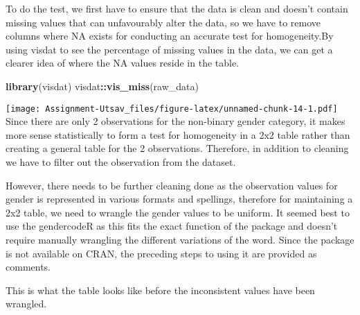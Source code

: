 \documentclass[
]{article}
\newenvironment{Shaded}{\begin{snugshade}}{\end{snugshade}}
\newcommand{\DecValTok}[1]{\textcolor[rgb]{0.00,0.00,0.81}{#1}}
\newcommand{\KeywordTok}[1]{\textcolor[rgb]{0.13,0.29,0.53}{\textbf{#1}}}
\newcommand{\NormalTok}[1]{#1}
\newcommand{\OperatorTok}[1]{\textcolor[rgb]{0.81,0.36,0.00}{\textbf{#1}}}
\newcommand{\StringTok}[1]{\textcolor[rgb]{0.31,0.60,0.02}{#1}}
\begin{document}
To do the test, we first have to ensure that the data is clean and
doesn't contain missing values that can unfavourably alter the data, so
we have to remove columns where NA exists for conducting an accurate
test for homogeneity.By using visdat to see the percentage of missing
values in the data, we can get a clearer idea of where the NA values
reside in the table.

\begin{Shaded}
\begin{Highlighting}[]
\KeywordTok{library}\NormalTok{(visdat)}
\NormalTok{visdat}\OperatorTok{::}\KeywordTok{vis_miss}\NormalTok{(raw_data)}
\end{Highlighting}
\end{Shaded}

\texttt{[image: Assignment-Utsav\_files/figure-latex/unnamed-chunk-14-1.pdf]}
Since there are only 2 observations for the non-binary gender category,
it makes more sense statistically to form a test for homogeneity in a
2x2 table rather than creating a general table for the 2 observations.
Therefore, in addition to cleaning we have to filter out the observation
from the dataset.

\begin{Shaded}
\end{Shaded}

However, there needs to be further cleaning done as the observation
values for gender is represented in various formats and spellings,
therefore for maintaining a 2x2 table, we need to wrangle the gender
values to be uniform. It seemed best to use the gendercodeR as this fits
the exact function of the package and doesn't require manually wrangling
the different variations of the word. Since the package is not available
on CRAN, the preceding steps to using it are provided as comments.

This is what the table looks like before the inconsistent values have
been wrangled.
\end{document}
